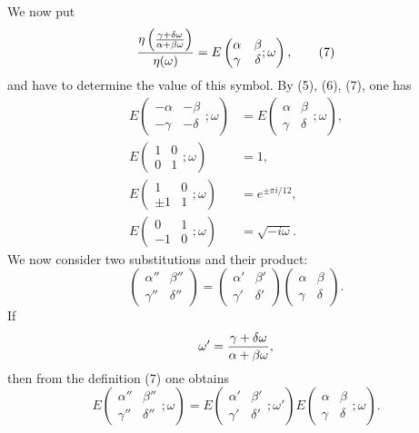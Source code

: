 \documentclass[11pt]{article}
\begin{document}
We now put
\begin{equation}
{\eta\left({\gamma+\delta\omega\over\alpha+\beta\omega}\right)\over\eta(\omega)}
=
E\left(\begin{matrix}\alpha&\beta\\ \gamma&\delta\end{matrix};\omega\right),
\tag{7}
\end{equation}
and have to determine the value of this symbol. By (5), (6), (7), one has
\begin{align}
E\left(\begin{matrix}-\alpha&-\beta\\-\gamma&-\delta\end{matrix};\omega\right)&=E\left(\begin{matrix}\alpha&\beta\\\gamma&\delta\end{matrix};\omega\right), \tag{8}\\
E\left(\begin{matrix}1&0\\0&1\end{matrix};\omega\right)&=1, \tag{9}\\
E\left(\begin{matrix}1&0\\ \pm1&1\end{matrix};\omega\right)&=e^{\pm\pi i/12}, \tag{10}\\
E\left(\begin{matrix}0&1\\-1&0\end{matrix};\omega\right)&=\sqrt{-i\omega}. \tag{11}
\end{align}
We now consider two substitutions and their product:
\[
\begin{pmatrix}\alpha''&\beta''\\ \gamma''&\delta''\end{pmatrix}
=
\begin{pmatrix}\alpha'&\beta'\\ \gamma'&\delta'\end{pmatrix}
\begin{pmatrix}\alpha&\beta\\ \gamma&\delta\end{pmatrix}.
\]
If
\[
\omega'={\gamma+\delta\omega\over\alpha+\beta\omega},
\]
then from the definition (7) one obtains
\begin{equation}
E\left(\begin{matrix}\alpha''&\beta''\\ \gamma''&\delta''\end{matrix};\omega\right)
=E\left(\begin{matrix}\alpha'&\beta'\\ \gamma'&\delta'\end{matrix};\omega'\right)
 E\left(\begin{matrix}\alpha&\beta\\ \gamma&\delta\end{matrix};\omega\right).
\tag{12}
\end{equation}
\end{document}

